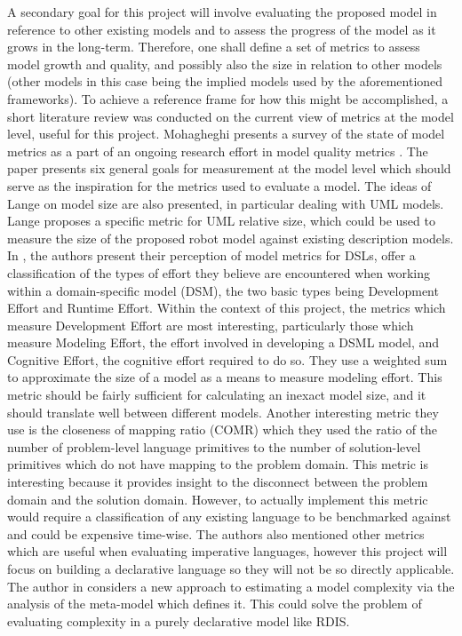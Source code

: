 A secondary goal for this project will involve evaluating the proposed model in reference to other existing models and to assess the progress of the model as it grows in the long-term. Therefore, one shall define a set of metrics to assess model growth and quality, and possibly also the size in relation to other models (other models in this case being the implied models used by the aforementioned frameworks). To achieve a reference frame for how this might be accomplished, a short literature review was conducted on the current view of metrics at the model level, useful for this project. Mohagheghi presents a survey of the state of model metrics as a part of an ongoing research effort in model quality metrics \cite{Mohagheghi2009}. The paper presents six general goals for measurement at the model level which should serve as the inspiration for the metrics used to evaluate a model. The ideas of Lange on model size \cite{Lange2007} are also presented, in particular dealing with UML models. Lange proposes a specific metric for UML relative size, which could be used to measure the size of the proposed robot model against existing description models. In \cite{Wu2010}, the authors present their perception of model metrics for DSLs, offer a classification of the types of effort they believe are encountered when working within a domain-specific model (DSM), the two basic types being Development Effort and Runtime Effort. Within the context of this project, the metrics which measure Development Effort are most interesting, particularly those which measure Modeling Effort, the effort involved in developing a DSML model, and Cognitive Effort, the cognitive effort required to do so. They use a weighted sum to approximate the size of a model as a means to measure modeling effort. This metric should be fairly sufficient for calculating an inexact model size, and it should translate well between different models. Another interesting metric they use is the closeness of mapping ratio (COMR) which they used the ratio of the number of problem-level language primitives to the number of solution-level primitives which do not have mapping to the problem domain. This metric is interesting because it provides insight to the disconnect between the problem domain and the solution domain. However, to actually implement this metric would require a classification of any existing language to be benchmarked against and could be expensive time-wise. The authors also mentioned other metrics which are useful when evaluating imperative languages, however this project will focus on building a declarative language so they will not be so directly applicable. The author in \cite{Sprinkle2010} considers a new approach to estimating a model complexity via the analysis of the meta-model which defines it. This could solve the problem of evaluating complexity in a purely declarative model like RDIS.


